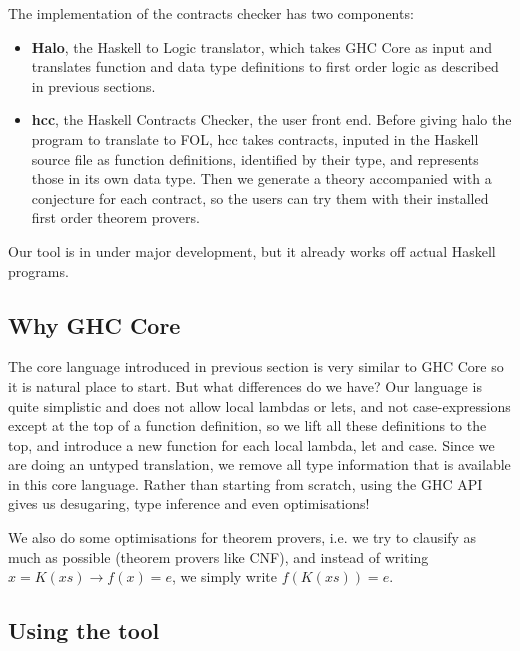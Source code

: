 The implementation of the contracts checker has two components:

\begin{itemize}
    \item \textbf{Halo}, the Haskell to Logic translator, which takes
       GHC Core as input and translates function and data type
       definitions to first order logic as described in previous sections.

     \item \textbf{hcc}, the Haskell Contracts Checker, the user front
        end. Before giving halo the program to translate to FOL, hcc
        takes contracts, inputed in the Haskell source file as function
        definitions, identified by their type, and represents those in
        its own data type. Then we generate a theory accompanied with a
        conjecture for each contract, so the users can try them with
        their installed first order theorem provers.
\end{itemize}

Our tool is in under major development, but it already works off
actual Haskell programs.

\subsection{Why GHC Core}

The core language introduced in previous section  is very
similar to GHC Core so it is natural place to start. But what
differences do we have? Our language
 is quite simplistic and does not allow local lambdas
or lets, and not case-expressions except at the top of a function
definition, so we lift all these definitions to the top, and introduce
a new function for each local lambda, let and case.  Since we are
doing an untyped translation, we remove all type information that is
available in this core language.
Rather than starting from scratch, using the GHC API gives us
desugaring, type inference and even optimisations!

We also do some optimisations for theorem provers, i.e. we try to
clausify as much as possible (theorem provers like CNF), and instead
of writing $x = K(xs) \rightarrow f(x) = e$, we simply write $f(K(xs)) = e$.

\subsection{Using the tool}

